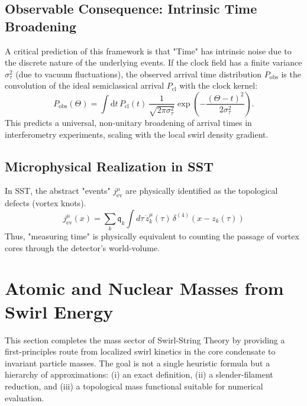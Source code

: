\documentclass[10pt]{article}
\begin{document}
    \subsection{Observable Consequence: Intrinsic Time Broadening}
        A critical prediction of this framework is that "Time" has intrinsic noise due to the discrete nature of the underlying events.
        If the clock field has a finite variance $\sigma_\tau^2$ (due to vacuum fluctuations), the observed arrival time distribution $P_{\mathrm{obs}}$ is the convolution of the ideal semiclassical arrival $P_{\mathrm{cl}}$ with the clock kernel:
        \begin{equation}
            P_{\mathrm{obs}}(\Theta) = \int \mathrm{d}t \, P_{\mathrm{cl}}(t) \, \frac{1}{\sqrt{2\pi\sigma_\tau^2}} \exp\left( -\frac{(\Theta - t)^2}{2\sigma_\tau^2} \right).
        \end{equation}
        This predicts a universal, non-unitary broadening of arrival times in interferometry experiments, scaling with the local swirl density gradient.

    \subsection{Microphysical Realization in SST}
        In SST, the abstract "events" $j_{\mathrm{ev}}^\mu$ are physically identified as the topological defects (vortex knots).
        \begin{equation}
            j_{\mathrm{ev}}^\mu(x) = \sum_{k} \mathfrak{q}_k \int d\tau \, \dot{z}_k^\mu(\tau) \, \delta^{(4)}(x - z_k(\tau))
        \end{equation}
        Thus, "measuring time" is physically equivalent to counting the passage of vortex cores through the detector's world-volume.
    \section{Atomic and Nuclear Masses from Swirl Energy}
    \label{sec:mass_expanded}

    This section completes the mass sector of Swirl-String Theory by providing a
    first-principles route from localized swirl kinetics in the core condensate to
    invariant particle masses. The goal is not a single heuristic formula but a
    hierarchy of approximations: (i) an exact definition, (ii) a slender-filament
    reduction, and (iii) a topological mass functional suitable for numerical
    evaluation.
\end{document}
